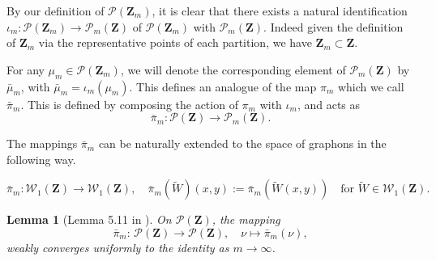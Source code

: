 \documentclass[12pt,twoside,a4paper]{article}
\newtheorem{lemma}[theorem]{Lemma}
\newcommand{\Space}{\mathbf{Z}}
\newcommand{\Graphon}{\mathcal{W}_1}
\begin{document}
By our definition of $\mathcal{P}(\Space_m)$, it is clear that  there exists a natural identification $\iota_m:\mathcal{P}(\Space_m)\to \mathcal{P}_m(\Space)$ of $\mathcal{P}(\Space_m)$ with $\mathcal{P}_m(\Space).$ Indeed given the definition of $\Space_m$ via the representative points of each partition, we have $\Space_m \subset \Space$.

For any $\mu_m \in \mathcal{P}(\Space_m)$, we will denote the corresponding element of $\mathcal{P}_m(\Space)$ by $\bar{\mu}_m$, with $\bar{\mu}_m=\iota_m(\mu_m)$. This defines an analogue of the map $\pi_m$ which we call $\bar{\pi}_m$. This is defined by composing the action of $\pi_m$ with $\iota_m$, and acts as 
\[
\bar{\pi}_m : \mathcal{P}(\Space) \to \mathcal{P}_m(\Space).
\]


The mappings $\bar{\pi}_m$ can be naturally extended to the space of graphons in the following way.

\[
\bar{\pi}_m : \Graphon(\Space) \to \Graphon(\Space) , \quad \bar{\pi}_m(\widetilde{W}) (x,y):= \bar{\pi}_m(\widetilde{W} (x,y))\quad \text{for } \widetilde{W} \in \Graphon(\Space).
\]


\begin{lemma}[Lemma 5.11 in \cite{andreis2023large}]
  \label{ApproxIdentProbMeas}  On $\mathcal{P}(\Space)$, the mapping
\[
\bar{\pi}_m:\,\mathcal{P}(\Space) \to \mathcal{P}(\Space), \quad \nu \mapsto \bar{\pi}_m(\nu),
\]
weakly converges uniformly to the identity as $m \to \infty$.
\end{lemma}
\end{document}
